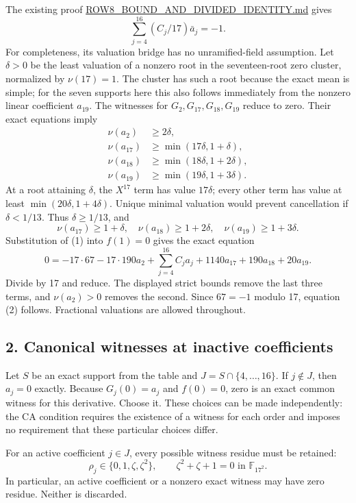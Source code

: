 \documentclass[
  british,
  10pt,
]{article}
\begin{document}
The existing proof
\href{evidence/full/wild17/ROW8_BOUND_AND_DIVIDED_IDENTITY.md}{ROW8\_BOUND\_AND\_DIVIDED\_IDENTITY.md}
gives \[
\sum_{j=4}^{16}(C_j/17)\bar a_j=-1.
\tag{2}
\] For completeness, its valuation bridge has no unramified-field
assumption. Let \(\delta>0\) be the least valuation of a nonzero root in
the seventeen-root zero cluster, normalized by \(\nu(17)=1\). The
cluster has such a root because the exact mean is simple; for the seven
supports here this also follows immediately from the nonzero linear
coefficient \(a_{19}\). The witnesses for \(G_2,G_{17},G_{18},G_{19}\)
reduce to zero. Their exact equations imply \[
\begin{aligned}
\nu(a_2)&\ge2\delta,\\
\nu(a_{17})&\ge\min(17\delta,1+\delta),\\
\nu(a_{18})&\ge\min(18\delta,1+2\delta),\\
\nu(a_{19})&\ge\min(19\delta,1+3\delta).
\end{aligned}
\] At a root attaining \(\delta\), the \(X^{17}\) term has value
\(17\delta\); every other term has value at least
\(\min(20\delta,1+4\delta)\). Unique minimal valuation would prevent
cancellation if \(\delta<1/13\). Thus \(\delta\ge1/13\), and \[
\nu(a_{17})\ge1+\delta,\quad
\nu(a_{18})\ge1+2\delta,\quad
\nu(a_{19})\ge1+3\delta.
\] Substitution of (1) into \(f(1)=0\) gives the exact equation \[
0=-17\cdot67-17\cdot190a_2
+\sum_{j=4}^{16}C_ja_j
+1140a_{17}+190a_{18}+20a_{19}.
\] Divide by 17 and reduce. The displayed strict bounds remove the last
three terms, and \(\nu(a_2)>0\) removes the second. Since \(67=-1\)
modulo 17, equation (2) follows. Fractional valuations are allowed
throughout.

\subsection{2. Canonical witnesses at inactive
coefficients}\label{canonical-witnesses-at-inactive-coefficients}

Let \(S\) be an exact support from the table and
\(J=S\cap\{4,\ldots,16\}\). If \(j\notin J\), then \(a_j=0\) exactly.
Because \(G_j(0)=a_j\) and \(f(0)=0\), zero is an exact common witness
for this derivative. Choose it. These choices can be made independently:
the CA condition requires the existence of a witness for each order and
imposes no requirement that these particular choices differ.

For an active coefficient \(j\in J\), every possible witness residue
must be retained: \[
\rho_j\in\{0,1,\zeta,\zeta^2\},\qquad
\zeta^2+\zeta+1=0\text{ in }\mathbb F_{17^2}.
\] In particular, an active coefficient or a nonzero exact witness may
have zero residue. Neither is discarded.
\end{document}
